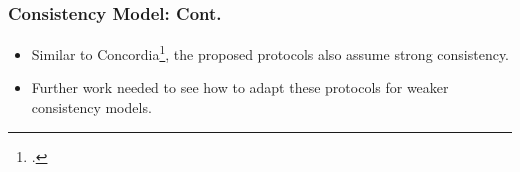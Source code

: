 \documentclass{beamer}
\begin{document}
\begin{frame}
    \frametitle{Consistency Model: Cont.}
    \begin{itemize}
        \item {
            Similar to Concordia\footcite{wang2021concordia}, the proposed protocols also assume
            strong consistency.
        }
        \item {
            Further work needed to see how to adapt these protocols for weaker consistency models.
        }
    \end{itemize}
\end{frame}
\end{document}
